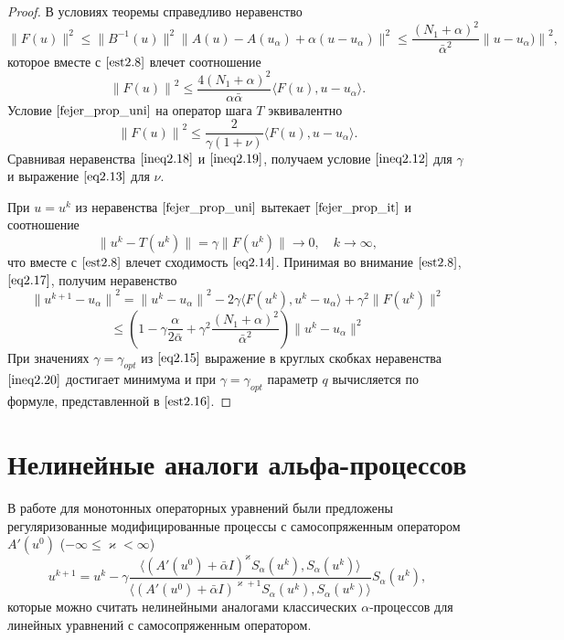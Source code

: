 \begin{proof}
В условиях теоремы справедливо неравенство
\begin{equation}\label{eq2.17}
\|F(u)\|^2\le\|B^{-1}(u)\|^2\|A(u)-A(u_\alpha)+\alpha(u-u_\alpha)\|^2 \le \frac{(N_1+\alpha)^2}{\bar\alpha^2}{\|u-u_\alpha)\|}^2,
\end{equation}
которое вместе с $\eqref{est2.8}$ влечет соотношение
\begin{equation}\label{ineq2.18}
{\|F(u)\|}^2 \le \frac{4(N_1+\alpha)^2}{\alpha\bar\alpha}\langle F(u), u-u_\alpha\rangle.
\end{equation}
Условие $\eqref{fejer_prop_uni}$ на оператор шага $T$ эквивалентно 
\begin{equation}\label{ineq2.19}
{\|F(u)\|}^2 \le \frac{2}{\gamma(1+\nu)}\langle F(u), u-u_\alpha\rangle.
\end{equation}
Сравнивая неравенства $\eqref{ineq2.18}$ и $\eqref{ineq2.19}$, получаем условие $\eqref{ineq2.12}$ для $\gamma$ и выражение $\eqref{eq2.13}$ для $\nu$.

При $u=u^k$ из неравенства $\eqref{fejer_prop_uni}$ вытекает $\eqref{fejer_prop_it}$ и соотношение
$$ \|u^k-T(u^k)\|=\gamma\|F(u^k)\|\to 0, \quad k\to\infty,$$ что вместе с $\eqref{est2.8}$ влечет сходимость $\eqref{eq2.14}$.
Принимая во внимание $\eqref{est2.8}$, $\eqref{eq2.17}$, получим неравенство
$$ {\|u^{k+1}-u_\alpha\|}^2={\|u^k-u_\alpha\|}^2-2\gamma\langle F(u^k), u^k-u_\alpha\rangle+{\gamma}^2\|F(u^k)\|^2 $$
\begin{equation}\label{ineq2.20}
\le \left (1-\gamma\frac{\alpha}{2\bar\alpha}+{\gamma}^2\frac{(N_1+\alpha)^2}{{\bar\alpha}^2}\right )\|u^k-u_\alpha\|^2
\end{equation}
При значениях $\gamma={\gamma}_{opt}$ из $\eqref{eq2.15}$ выражение в круглых скобках неравенства $\eqref{ineq2.20}$ достигает минимума и при $\gamma={\gamma}_{opt}$ параметр $q$ вычисляется по формуле, представленной в $\eqref{est2.16}$.
\end{proof}

\newpage
\section{Нелинейные аналоги альфа-процессов}

В работе \cite{Vasin2016} для монотонных операторных уравнений были предложены регуляризованные модифицированные процессы с самосопряженным оператором $A'(u^0)$ ($-\infty \le \varkappa <\infty$)
$$
u^{k+1}=u^k-\gamma\frac{\langle (A'(u^0)+\bar\alpha I)^{\varkappa}S_\alpha(u^k), S_\alpha(u^k)\rangle }{\langle(A'(u^0)+\bar\alpha I)^{\varkappa+1}S_\alpha(u^k), S_\alpha(u^k)\rangle }S_\alpha(u^k),
$$
которые можно считать нелинейными аналогами классических $\alpha$-процессов для линейных уравнений с самосопряженным оператором.

